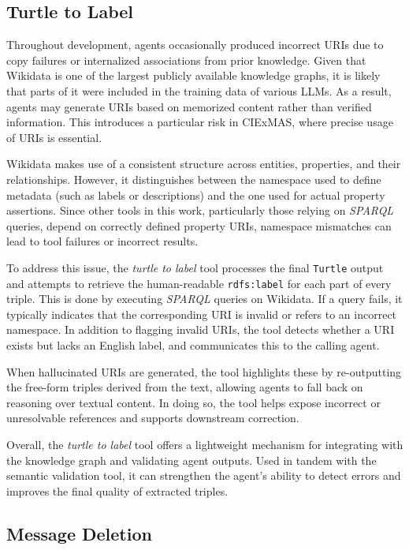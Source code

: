 \documentclass[a4paper,oneside,bibliography=totoc]{scrbook}
\begin{document}
\subsection{Turtle to Label}
\label{subsec:turtle_to_label}

Throughout development, agents occasionally produced incorrect URIs due to copy failures or internalized associations from prior knowledge. Given that Wikidata is one of the largest publicly available knowledge graphs, it is likely that parts of it were included in the training data of various \acp{LLM}. As a result, agents may generate URIs based on memorized content rather than verified information. This introduces a particular risk in CIExMAS, where precise usage of \acp{URI} is essential.

Wikidata makes use of a consistent structure across entities, properties, and their relationships. However, it distinguishes between the namespace used to define metadata (such as labels or descriptions) and the one used for actual property assertions. Since other tools in this work, particularly those relying on \textit{SPARQL} queries, depend on correctly defined property URIs, namespace mismatches can lead to tool failures or incorrect results.

To address this issue, the \textit{turtle to label} tool processes the final \texttt{Turtle} output and attempts to retrieve the human-readable \texttt{rdfs:label} for each part of every triple. This is done by executing \textit{SPARQL} queries on Wikidata. If a query fails, it typically indicates that the corresponding URI is invalid or refers to an incorrect namespace. In addition to flagging invalid URIs, the tool detects whether a URI exists but lacks an English label, and communicates this to the calling agent.

When hallucinated URIs are generated, the tool highlights these by re-outputting the free-form triples derived from the text, allowing agents to fall back on reasoning over textual content. In doing so, the tool helps expose incorrect or unresolvable references and supports downstream correction.

Overall, the \textit{turtle to label} tool offers a lightweight mechanism for integrating with the knowledge graph and validating agent outputs. Used in tandem with the semantic validation tool, it can strengthen the agent’s ability to detect errors and improves the final quality of extracted triples.

\subsection{Message Deletion}
\label{subsec:message_deletion}
\end{document}
